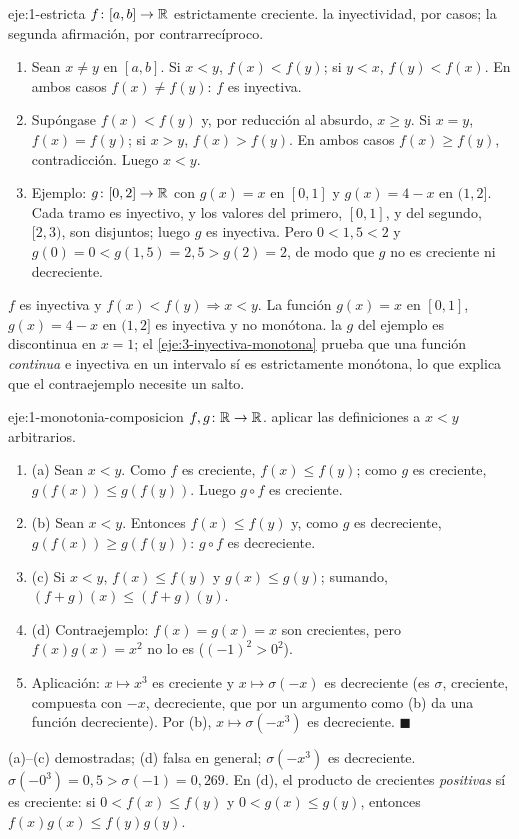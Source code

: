 \begin{solucion}{eje:1-estricta}
\datos $f\colon[a,b]\to\mathbb{R}$ estrictamente creciente.
\planteamiento la inyectividad, por casos; la segunda afirmación, por contrarrecíproco.
\pasos
\begin{enumerate}[label=\arabic*.]
  \item Sean $x\ne y$ en $[a,b]$. Si $x<y$, $f(x)<f(y)$; si $y<x$, $f(y)<f(x)$. En ambos casos $f(x)\ne f(y)$: $f$ es inyectiva.
  \item Supóngase $f(x)<f(y)$ y, por reducción al absurdo, $x\ge y$. Si $x=y$, $f(x)=f(y)$; si $x>y$, $f(x)>f(y)$. En ambos casos $f(x)\ge f(y)$, contradicción. Luego $x<y$.
  \item Ejemplo: $g\colon[0,2]\to\mathbb{R}$ con $g(x)=x$ en $[0,1]$ y $g(x)=4-x$ en $(1,2]$. Cada tramo es inyectivo, y los valores del primero, $[0,1]$, y del segundo, $[2,3)$, son disjuntos; luego $g$ es inyectiva. Pero $0<1{,}5<2$ y $g(0)=0<g(1{,}5)=2{,}5>g(2)=2$, de modo que $g$ no es creciente ni decreciente.
\end{enumerate}
\resultado $f$ es inyectiva y $f(x)<f(y)\Rightarrow x<y$. La función $g(x)=x$ en $[0,1]$, $g(x)=4-x$ en $(1,2]$ es inyectiva y no monótona.
\comprobacion la $g$ del ejemplo es discontinua en $x=1$; el \cref{eje:3-inyectiva-monotona} prueba que una función \emph{continua} e inyectiva en un intervalo sí es estrictamente monótona, lo que explica que el contraejemplo necesite un salto.
\end{solucion}

\begin{solucion}{eje:1-monotonia-composicion}
\datos $f,g\colon\mathbb{R}\to\mathbb{R}$.
\planteamiento aplicar las definiciones a $x<y$ arbitrarios.
\pasos
\begin{enumerate}[label=\arabic*.]
  \item (a) Sean $x<y$. Como $f$ es creciente, $f(x)\le f(y)$; como $g$ es creciente, $g(f(x))\le g(f(y))$. Luego $g\circ f$ es creciente.
  \item (b) Sean $x<y$. Entonces $f(x)\le f(y)$ y, como $g$ es decreciente, $g(f(x))\ge g(f(y))$: $g\circ f$ es decreciente.
  \item (c) Si $x<y$, $f(x)\le f(y)$ y $g(x)\le g(y)$; sumando, $(f+g)(x)\le(f+g)(y)$.
  \item (d) Contraejemplo: $f(x)=g(x)=x$ son crecientes, pero $f(x)g(x)=x^{2}$ no lo es ($(-1)^{2}>0^{2}$).
  \item Aplicación: $x\mapsto x^{3}$ es creciente y $x\mapsto\sigma(-x)$ es decreciente (es $\sigma$, creciente, compuesta con $-x$, decreciente, que por un argumento como (b) da una función decreciente). Por (b), $x\mapsto\sigma(-x^{3})$ es decreciente. \hfill$\blacksquare$
\end{enumerate}
\resultado (a)--(c) demostradas; (d) falsa en general; $\sigma(-x^{3})$ es decreciente.
\comprobacion $\sigma(-0^{3})=0{,}5>\sigma(-1)=0{,}269$. En (d), el producto de crecientes \emph{positivas} sí es creciente: si $0<f(x)\le f(y)$ y $0<g(x)\le g(y)$, entonces $f(x)g(x)\le f(y)g(y)$.
\end{solucion}

